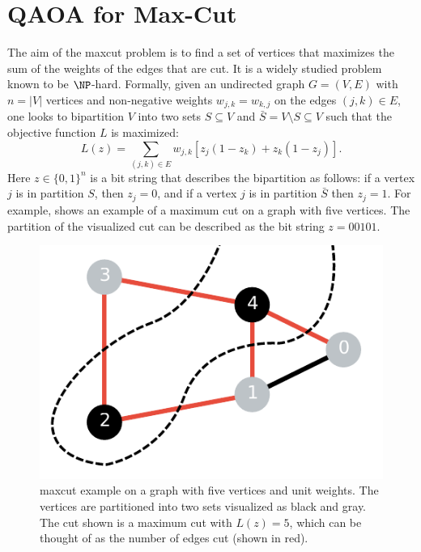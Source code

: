 \chapter{QAOA for Max-Cut}
The aim of the \gls{maxcut} problem is to find a set of vertices that maximizes the sum of the weights of the edges that are cut.
It is a widely studied problem known to be $\NP$-hard.
Formally, given an undirected graph $G = (V, E)$ with $n = |V|$ vertices and non-negative weights $w_{j, k} = w_{k, j}$ on the edges $(j, k) \in E$, one looks to bipartition $V$ into two sets $S \subseteq V$ and $\bar{S} = V \setminus S \subseteq V$ such that the objective function $L$ is maximized:
\begin{equation} \label{eqn:max-cut-objective}
L(z) = \sum_{(j, k) \in E} w_{j, k}[z_j(1 - z_k) + z_k(1 - z_j)].
\end{equation}
Here $z \in \{0, 1\}^n$ is a bit string that describes the bipartition as follows: if a vertex $j$ is in partition $S$, then $z_j = 0$, and if a vertex $j$ is in partition $\bar{S}$ then $z_j = 1$.
For example,  shows an example of a maximum cut on a graph with five vertices.
The partition of the visualized cut can be described as the bit string $z = 00101$.
\begin{figure}[ht]
    \centering
    \includegraphics[width=0.4\linewidth]{figures/maxcut_5_graph_cut_example.pdf}
    \caption[\Gls{maxcut} example on a graph with five vertices and unit weights.]{
        \Gls{maxcut} example on a graph with five vertices and unit weights.
        The vertices are partitioned into two sets visualized as black and gray.
        The cut shown is a maximum cut with $L(z) = 5$, which can be thought of as the number of edges cut (shown in red).
    }
    \label{fig:maxcut-5-example}
\end{figure}

